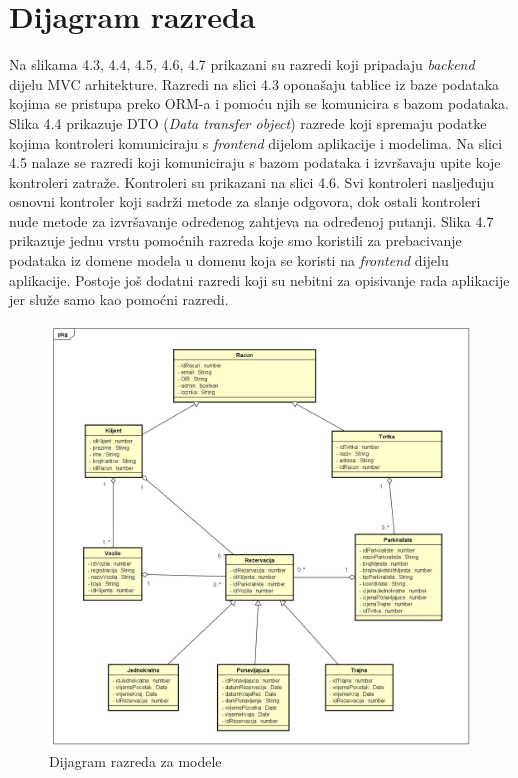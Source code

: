 			\eject
			
			
		\section{Dijagram razreda}
		
		Na  slikama 4.3, 4.4, 4.5, 4.6, 4.7 prikazani su razredi koji pripadaju \textit{backend} dijelu MVC arhitekture. Razredi na slici 4.3 oponašaju tablice iz baze podataka kojima se pristupa preko ORM-a i pomoću njih se komunicira s bazom podataka. Slika 4.4 prikazuje DTO (\textit{Data transfer object}) razrede koji spremaju podatke kojima kontroleri komuniciraju s \textit{frontend} dijelom aplikacije i modelima. Na slici 4.5 nalaze se razredi koji komuniciraju s bazom podataka i izvršavaju upite koje kontroleri zatraže. Kontroleri su prikazani na slici 4.6. Svi kontroleri nasljeđuju osnovni kontroler koji sadrži metode za slanje odgovora, dok ostali kontroleri nude metode za izvršavanje određenog zahtjeva na određenoj putanji. Slika 4.7 prikazuje jednu vrstu pomoćnih razreda koje smo koristili za prebacivanje podataka iz domene modela u domenu koja se koristi na \textit{frontend} dijelu aplikacije. Postoje još dodatni razredi koji su nebitni za opisivanje rada aplikacije jer služe samo kao pomoćni razredi.
		
		\begin{figure}[H]
	        \includegraphics[width=1\linewidth]{dijagrami/Dijagram razreda - Models.png}
        	\caption{Dijagram razreda za modele}
        	\label{fig:Dijagram razreda - modeli}
        \end{figure}
    
